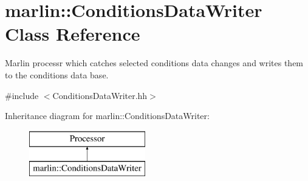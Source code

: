 \section{marlin\-:\-:Conditions\-Data\-Writer Class Reference}
\label{classmarlin_1_1ConditionsDataWriter}


Marlin processr which catches selected conditions data changes and writes them to the conditions data base.  




{\ttfamily \#include $<$Conditions\-Data\-Writer.\-hh$>$}

Inheritance diagram for marlin\-:\-:Conditions\-Data\-Writer\-:\begin{figure}[H]
\begin{center}
\leavevmode
\includegraphics[height=2.000000cm]{classmarlin_1_1ConditionsDataWriter}
\end{center}
\end{figure}
